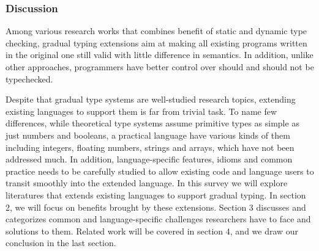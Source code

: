 \subsubsection{Discussion}

Among various research works that combines
benefit of static and dynamic type checking,
gradual typing extensions aim at
making all existing programs written
in the original one still valid with little difference in semantics.
In addition, unlike other approaches, programmers have better control over should and should not be typechecked.

Despite that gradual type systems are well-studied research topics,
extending existing languages to support them is far from trivial task.
To name few differences, while theoretical type systems assume primitive types as simple as just numbers and booleans,
a practical language have various kinds of them including integers, floating numbers, strings and arrays,
which have not been addressed much.
In addition, language-specific features, idioms and common practice needs
to be carefully studied to allow existing code and language users to transit smoothly into
the extended language. In this survey we will explore literatures that extends existing languages to support gradual typing.
In section 2, we will focus on benefits brought by these extensions.
Section 3 discusses and categorizes common and language-specific
challenges researchers have to face and solutions to them.
Related work will be covered in section 4, and
we draw our conclusion in the last section.